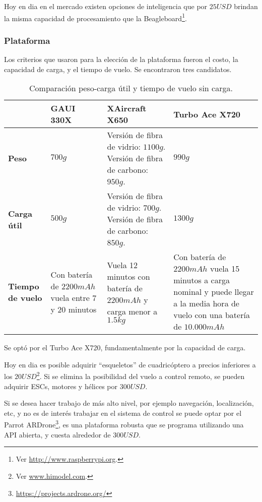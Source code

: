 \documentclass[main]{subfiles}
\begin{document}
Hoy en dia en el mercado existen opciones de inteligencia que por $25USD$ brindan la misma capacidad de procesamiento que la Beagleboard\footnote{Ver \url{http://www.raspberrypi.org}.}.

\subsubsection{Plataforma}
\label{sec:anexo_costos-plataforma}

Los criterios que usaron para la elección de la plataforma fueron el costo, la capacidad de carga, y el tiempo de vuelo. Se encontraron tres candidatos.

\begin{table}[H]
\begin{tabular}{p{40pt}|p{70pt}|p{160pt}|p{120pt}|} 
\cline{2-4}
& \cellcolor[gray]{0.8} \textbf{GAUI 330X} 
& \cellcolor[gray]{0.8} \textbf{XAircraft X650} 
& \cellcolor[gray]{0.8} \textbf{Turbo Ace X720} \\ \cline{2-4}
\hline
\multicolumn{1}{|p{40pt}|}{\cellcolor[gray]{0.8}\textbf{Peso}} 
& $700g$ & Versi\'on de fibra de vidrio: $1100g$. Versi\'on de fibra de carbono: $950g$. & $990g$ \\
\hline
\multicolumn{1}{|p{40pt}|}{\cellcolor[gray]{0.8}\textbf{Carga \'util}} 
& $500g$ & Versi\'on de fibra de vidrio: $700g$. Versi\'on de fibra de carbono: $850g$. & $1300 g$ \\ 
\hline 
\multicolumn{1}{|p{40pt}|}{\cellcolor[gray]{0.8}\textbf{Tiempo de vuelo}} 
& Con bater\'ia de $2200 mAh$ vuela entre 7 y 20 minutos & Vuela 12 minutos con bater\'ia de $2200mAh$ y carga menor a $1.5kg$ & Con bater\'ia de $2200mAh$ vuela 15 minutos a carga nominal y puede llegar a la media hora de vuelo con una bater\'ia de $10.000mAh$ \\
\hline
\end{tabular}
\caption{Comparaci\'on peso-carga \'util y tiempo de vuelo sin carga.}
\label{tab:peso}
\end{table}

Se optó por el Turbo Ace X720, fundamentalmente por la capacidad de carga.

Hoy en dia es posible adquirir ``esqueletos'' de cuadric\'optero a precios inferiores a los $20USD$\footnote{Ver \url{www.himodel.com}.}. Si se elimina la posibilidad del vuelo a control remoto, se pueden adquirir ESCs, motores y h\'elices por $300 USD$.

Si se desea hacer trabajo de más alto nivel, por ejemplo navegación, localización, etc, y no es de interés trabajar en el sistema de control se puede optar por el Parrot ARDrone\footnote{\url{https://projects.ardrone.org/}}, es una plataforma robusta que se programa utilizando una API abierta, y cuesta alrededor de $300 USD$.
\end{document}

